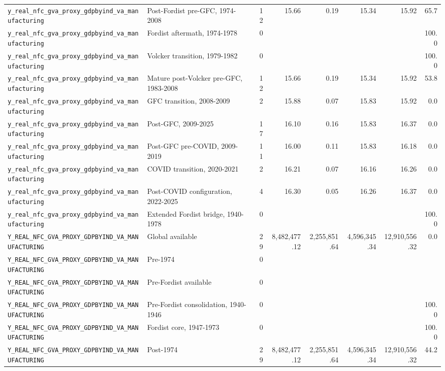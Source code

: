 \begin{landscape}
\begin{longtable}{p{4.4cm}p{3.8cm}rrrrrr}
\\
\nolinkurl{y_real_nfc_gva_proxy_gdpbyind_va_manufacturing} & Post-Fordist pre-GFC, 1974-2008 & 12 & 15.66 & 0.19 & 15.34 & 15.92 & 65.7
\\
\nolinkurl{y_real_nfc_gva_proxy_gdpbyind_va_manufacturing} & Fordist aftermath, 1974-1978 & 0 &  &  &  &  & 100.0
\\
\nolinkurl{y_real_nfc_gva_proxy_gdpbyind_va_manufacturing} & Volcker transition, 1979-1982 & 0 &  &  &  &  & 100.0
\\
\nolinkurl{y_real_nfc_gva_proxy_gdpbyind_va_manufacturing} & Mature post-Volcker pre-GFC, 1983-2008 & 12 & 15.66 & 0.19 & 15.34 & 15.92 & 53.8
\\
\nolinkurl{y_real_nfc_gva_proxy_gdpbyind_va_manufacturing} & GFC transition, 2008-2009 & 2 & 15.88 & 0.07 & 15.83 & 15.92 & 0.0
\\
\nolinkurl{y_real_nfc_gva_proxy_gdpbyind_va_manufacturing} & Post-GFC, 2009-2025 & 17 & 16.10 & 0.16 & 15.83 & 16.37 & 0.0
\\
\nolinkurl{y_real_nfc_gva_proxy_gdpbyind_va_manufacturing} & Post-GFC pre-COVID, 2009-2019 & 11 & 16.00 & 0.11 & 15.83 & 16.18 & 0.0
\\
\nolinkurl{y_real_nfc_gva_proxy_gdpbyind_va_manufacturing} & COVID transition, 2020-2021 & 2 & 16.21 & 0.07 & 16.16 & 16.26 & 0.0
\\
\nolinkurl{y_real_nfc_gva_proxy_gdpbyind_va_manufacturing} & Post-COVID configuration, 2022-2025 & 4 & 16.30 & 0.05 & 16.26 & 16.37 & 0.0
\\
\nolinkurl{y_real_nfc_gva_proxy_gdpbyind_va_manufacturing} & Extended Fordist bridge, 1940-1978 & 0 &  &  &  &  & 100.0
\\
\nolinkurl{Y_REAL_NFC_GVA_PROXY_GDPBYIND_VA_MANUFACTURING} & Global available & 29 & 8,482,477.12 & 2,255,851.64 & 4,596,345.34 & 12,910,556.32 & 0.0
\\
\nolinkurl{Y_REAL_NFC_GVA_PROXY_GDPBYIND_VA_MANUFACTURING} & Pre-1974 & 0 &  &  &  &  &
\\
\nolinkurl{Y_REAL_NFC_GVA_PROXY_GDPBYIND_VA_MANUFACTURING} & Pre-Fordist available & 0 &  &  &  &  &
\\
\nolinkurl{Y_REAL_NFC_GVA_PROXY_GDPBYIND_VA_MANUFACTURING} & Pre-Fordist consolidation, 1940-1946 & 0 &  &  &  &  & 100.0
\\
\nolinkurl{Y_REAL_NFC_GVA_PROXY_GDPBYIND_VA_MANUFACTURING} & Fordist core, 1947-1973 & 0 &  &  &  &  & 100.0
\\
\nolinkurl{Y_REAL_NFC_GVA_PROXY_GDPBYIND_VA_MANUFACTURING} & Post-1974 & 29 & 8,482,477.12 & 2,255,851.64 & 4,596,345.34 & 12,910,556.32 & 44.2

\end{longtable}
\end{landscape}
